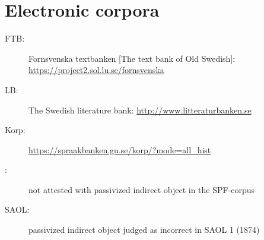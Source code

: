 \documentclass[output=paper]{langscibook}
\begin{document}
\section*{Electronic corpora}

\begin{description}
\item[FTB:] Fornsvenska textbanken [The text bank of Old Swedish]: \url{https://project2.sol.lu.se/fornsvenska} 
\item[LB:] The Swedish literature bank: \url{http://www.litteraturbanken.se}
\item[Korp:] \url{https://spraakbanken.gu.se/korp/?mode=all_hist}
\end{description}



\label{falk:appendix:1}

\begin{description}
\item[\normalfont *:] not attested with passivized indirect object in the SPF-corpus
\item[\normalfont SAOL:] passivized indirect object judged as incorrect in SAOL 1 (1874)
\end{description}
\end{document}
